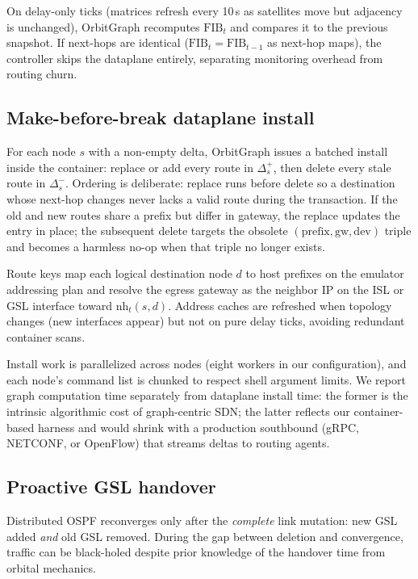 On delay-only ticks (matrices refresh every 10\,s as satellites move
but adjacency is unchanged), OrbitGraph recomputes $\mathrm{FIB}_t$ and compares
it to the previous snapshot.
If next-hops are identical ($\mathrm{FIB}_t = \mathrm{FIB}_{t-1}$ as next-hop
maps), the controller skips the dataplane entirely, separating monitoring
overhead from routing churn.

\subsection{Make-before-break dataplane install}
\label{sec:mbb}

For each node $s$ with a non-empty delta, OrbitGraph issues a batched install
inside the container: replace or add every route in $\Delta_s^{+}$, then delete
every stale route in $\Delta_s^{-}$.
Ordering is deliberate: replace runs before delete so a destination whose
next-hop changes never lacks a valid route during the transaction.
If the old and new routes share a prefix but differ in gateway, the replace
updates the entry in place; the subsequent delete targets the obsolete
$(\text{prefix}, \text{gw}, \text{dev})$ triple and becomes a harmless no-op
when that triple no longer exists.

Route keys map each logical destination node $d$ to host prefixes on the
emulator addressing plan and resolve the egress gateway as the neighbor IP on
the ISL or GSL interface toward $\mathrm{nh}_t(s,d)$.
Address caches are refreshed when topology changes (new interfaces appear) but
not on pure delay ticks, avoiding redundant container scans.

Install work is parallelized across nodes (eight workers in our configuration),
and each node's command list is chunked to respect shell argument limits.
We report graph computation time separately from dataplane install time: the
former is the intrinsic algorithmic cost of graph-centric SDN; the latter
reflects our container-based harness and would shrink with a production
southbound (gRPC, NETCONF, or OpenFlow) that streams deltas to routing agents.

\subsection{Proactive GSL handover}
\label{sec:proactive}

Distributed OSPF reconverges only after the \emph{complete} link mutation:
new GSL added \emph{and} old GSL removed.
During the gap between deletion and convergence, traffic can be black-holed
despite prior knowledge of the handover time from orbital mechanics.

